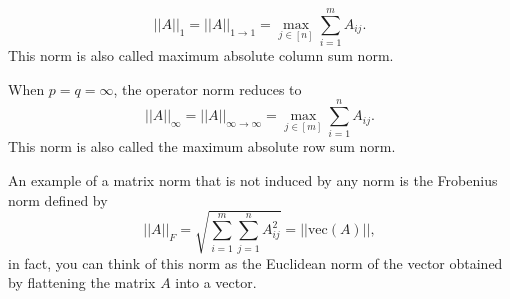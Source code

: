 \documentclass[10pt,a4paper]{article}
\begin{document}
\begin{equation*}
	||A||_1 = ||A||_{1\to1} = \max_{j\in[n]} \sum_{i=1}^{m} A_{ij}.
\end{equation*}
This norm is also called maximum absolute column sum norm.
\par When $p=q=\infty$, the operator norm reduces to 
\begin{equation*}
	||A||_\infty = ||A||_{\infty\to\infty} = \max_{j\in[m]} \sum_{i=1}^{n} A_{ij}.
\end{equation*}
This norm is also called the maximum absolute row sum norm.
\par An example of a matrix norm that is not induced by any norm is the Frobenius norm defined by
\begin{equation*}
	||A||_F = \sqrt{\sum_{i=1}^{m} \sum_{j=1}^{n} A^2_{ij}} = ||\text{vec}(A)||,
\end{equation*}
in fact, you can think of this norm as the Euclidean norm of the vector obtained by flattening the matrix $A$ into a vector.
\end{document}
